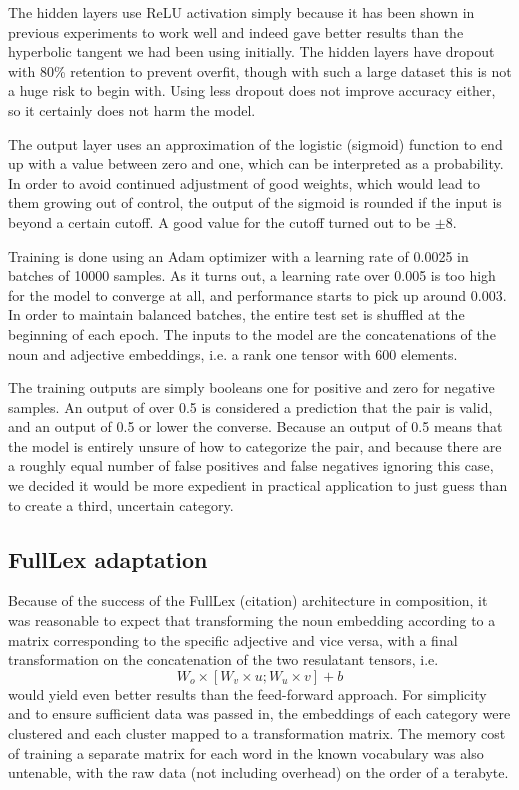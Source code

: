 \documentclass[a4paper, 11pt]{scrartcl}
\begin{document}
The hidden layers use ReLU activation simply because it has been shown in previous experiments to work well and indeed gave better results than the hyperbolic tangent we had been using initially. The hidden layers have dropout with 80\% retention to prevent overfit, though with such a large dataset this is not a huge risk to begin with. Using less dropout does not improve accuracy either, so it certainly does not harm the model.

The output layer uses an approximation of the logistic (sigmoid) function to end up with a value between zero and one, which can be interpreted as a probability. In order to avoid continued adjustment of good weights, which would lead to them growing out of control, the output of the sigmoid is rounded if the input is beyond a certain cutoff. A good value for the cutoff turned out to be $ \pm 8 $.

Training is done using an Adam optimizer with a learning rate of 0.0025 in batches of 10000 samples. As it turns out, a learning rate over 0.005 is too high for the model to converge at all, and performance starts to pick up around 0.003. In order to maintain balanced batches, the entire test set is shuffled at the beginning of each epoch. The inputs to the model are the concatenations of the noun and adjective embeddings, i.e. a rank one tensor with 600 elements.

The training outputs are simply booleans \textemdash one for positive and zero for negative samples. An output of over 0.5 is considered a prediction that the pair is valid, and an output of 0.5 or lower the converse. Because an output of 0.5 means that the model is entirely unsure of how to categorize the pair, and because there are a roughly equal number of false positives and false negatives ignoring this case, we decided it would be more expedient in practical application to just guess than to create a third, uncertain category.

\subsection{FullLex adaptation}
Because of the success of the FullLex (citation) architecture in composition, it was reasonable to expect that transforming the noun embedding according to a matrix corresponding to the specific adjective and vice versa, with a final transformation on the concatenation of the two resulatant tensors, i.e. $$ W_o \times [W_v \times u; W_u \times v] + b $$ would yield even better results than the feed-forward approach. For simplicity and to ensure sufficient data was passed in, the embeddings of each category were clustered and each cluster mapped to a transformation matrix. The memory cost of training a separate matrix for each word in the known vocabulary was also untenable, with the raw data (not including overhead) on the order of a terabyte.
\end{document}

